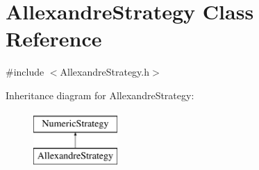 \hypertarget{class_allexandre_strategy}{\section{Allexandre\+Strategy Class Reference}
\label{class_allexandre_strategy}
}


{\ttfamily \#include $<$Allexandre\+Strategy.\+h$>$}

Inheritance diagram for Allexandre\+Strategy\+:\begin{figure}[H]
\begin{center}
\leavevmode
\includegraphics[height=2.000000cm]{class_allexandre_strategy}
\end{center}
\end{figure}
